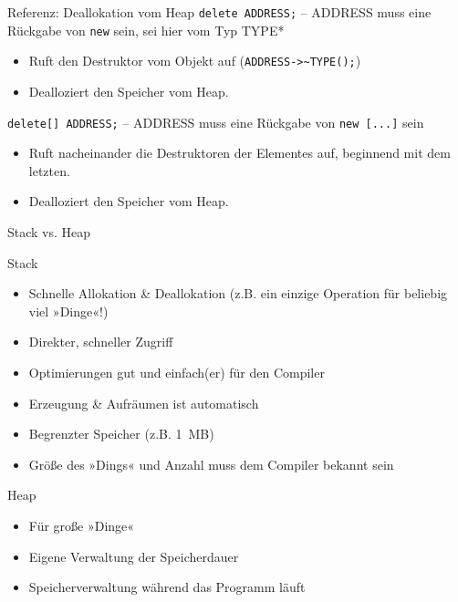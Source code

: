 {
\begin{frame}[fragile]{Referenz: Deallokation vom Heap}
	\verb|delete ADDRESS;| -- ADDRESS muss eine Rückgabe von \verb|new| sein, sei hier vom Typ TYPE*
	\begin{itemize}
		\item Ruft den Destruktor vom Objekt auf (\verb|ADDRESS->~TYPE();|)
		\item Dealloziert den Speicher vom Heap.
	\end{itemize}
	
	\vspace{2em}
	
	\verb|delete[] ADDRESS;| -- ADDRESS muss eine Rückgabe von \verb|new [...]| sein
	\begin{itemize}
		\item Ruft nacheinander die Destruktoren der Elementes auf, beginnend mit dem letzten.
		\item Dealloziert den Speicher vom Heap.
	\end{itemize}
\end{frame}
}


\begin{frame}[fragile]{Stack vs. Heap}
	\begin{block}{Stack}
		\begin{itemize}
			\item Schnelle Allokation \& Deallokation {\tiny(z.B. ein einzige Operation für beliebig viel »Dinge«!)}
			\item Direkter, schneller Zugriff
			\item Optimierungen gut und einfach(er) für den Compiler
			\item Erzeugung \& Aufräumen ist automatisch
			\item Begrenzter Speicher (z.B. 1~MB)
			\item Größe des »Dings« und Anzahl muss dem Compiler bekannt sein
		\end{itemize}
	\end{block}
	
	\begin{block}{Heap}
		\begin{itemize}
			\item Für große »Dinge«
			\item Eigene Verwaltung der Speicherdauer
			\item Speicherverwaltung während das Programm läuft
		\end{itemize}
	\end{block}
\end{frame}
